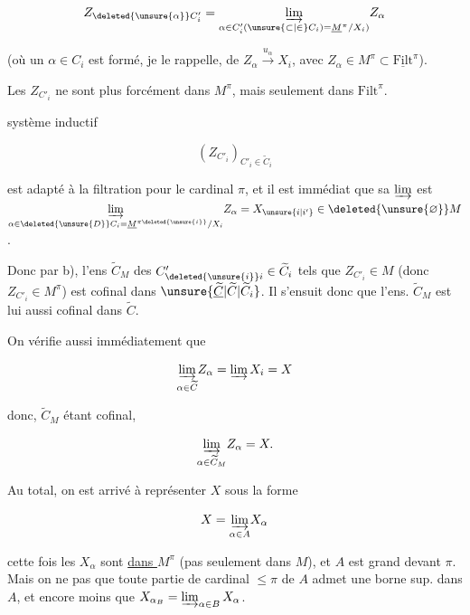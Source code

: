 \[
 Z_{\deleted{\unsure{\alpha}} C'_i}=\underset{\alpha\in C'_i(\unsure{\subset|\in} C_i)=\underline M^\pi/X_i)}{\varinjlim} Z_\alpha
\]

(où un $\alpha\in C_i$ est formé, je le rappelle, de $Z_\alpha\xrightarrow{u_\alpha}X_i$, avec $Z_\alpha\in M^\pi\subset\underline{\mathrm{Filt}}^\pi$).

Les $Z_{C'_i}$ ne sont plus forcément dans $M^\pi$, mais seulement dans $\mathrm{Filt}^\pi$.   

  système inductif

\[
 (Z_{C'_i})_{C'_i\in\widetilde C_i}
\]

est   adapté à la filtration  pour le cardinal $\pi$, et il est immédiat que sa $\varinjlim$ est  $\underset{\alpha\in\deleted{\unsure{D}} C_i=\underline M^{\pi\deleted{\unsure{i}}}/X_i}{\varinjlim} Z_\alpha=X_{\unsure{i|i'}}\in\deleted{\unsure{\varnothing}} M$.

Donc par b), l'ens  $\widetilde C_M$ des $C'_{\deleted{\unsure{i}} i}\in\widetilde C_i$ tels que $Z_{C'_i}\in M$ (donc $Z_{C'_i}\in M^\pi$) est cofinal dans $\unsure{\underline{\widetilde C}|\widetilde C|\widetilde C_i}$. Il s'ensuit donc que l'ens. $\widetilde C_M$ est lui aussi cofinal dans $\widetilde C$.


On vérifie aussi immédiatement que

\[
 \underset{\alpha\in\widetilde C}{\varinjlim} Z_\alpha=\varinjlim X_i=X
\]

donc, $\widetilde C_M$ étant cofinal,

\[
 \underset{\alpha\in\widetilde C_M}{\varinjlim} Z_\alpha=X.
\]


Au total, on est arrivé à représenter $X$ sous la forme

\[
 X=\underset{\alpha\in A}{\varinjlim} X_\alpha
\]

 cette fois les $X_\alpha$ sont \uline{dans $M^\pi$} (pas seulement dans $M$), et $A$ est  grand devant $\pi$.  Mais on ne  pas que  toute partie  de cardinal $\leq\pi$ de $A$ admet une borne sup.  dans $A$, et encore moins que $X_{\alpha_B}=\varinjlim_{\alpha\in B} X_\alpha$.

